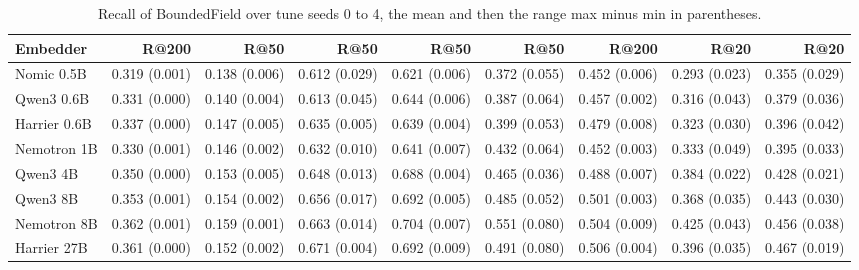 \begin{table}[!htbp]
\begin{subtable}{\textwidth}
\begin{tabular}{lrrrrrrrr}
Embedder & R@200 & R@50 & R@50 & R@50 & R@50 & R@200 & R@20 & R@20 \\
\midrule
Nomic 0.5B & 0.319 (0.001) & 0.138 (0.006) & 0.612 (0.029) & 0.621 (0.006) & 0.372 (0.055) & 0.452 (0.006) & 0.293 (0.023) & 0.355 (0.029) \\
Qwen3 0.6B & 0.331 (0.000) & 0.140 (0.004) & 0.613 (0.045) & 0.644 (0.006) & 0.387 (0.064) & 0.457 (0.002) & 0.316 (0.043) & 0.379 (0.036) \\
Harrier 0.6B & 0.337 (0.000) & 0.147 (0.005) & 0.635 (0.005) & 0.639 (0.004) & 0.399 (0.053) & 0.479 (0.008) & 0.323 (0.030) & 0.396 (0.042) \\
Nemotron 1B & 0.330 (0.001) & 0.146 (0.002) & 0.632 (0.010) & 0.641 (0.007) & 0.432 (0.064) & 0.452 (0.003) & 0.333 (0.049) & 0.395 (0.033) \\
Qwen3 4B & 0.350 (0.000) & 0.153 (0.005) & 0.648 (0.013) & 0.688 (0.004) & 0.465 (0.036) & 0.488 (0.007) & 0.384 (0.022) & 0.428 (0.021) \\
Qwen3 8B & 0.353 (0.001) & 0.154 (0.002) & 0.656 (0.017) & 0.692 (0.005) & 0.485 (0.052) & 0.501 (0.003) & 0.368 (0.035) & 0.443 (0.030) \\
Nemotron 8B & 0.362 (0.001) & 0.159 (0.001) & 0.663 (0.014) & 0.704 (0.007) & 0.551 (0.080) & 0.504 (0.009) & 0.425 (0.043) & 0.456 (0.038) \\
Harrier 27B & 0.361 (0.000) & 0.152 (0.002) & 0.671 (0.004) & 0.692 (0.009) & 0.491 (0.080) & 0.506 (0.004) & 0.396 (0.035) & 0.467 (0.019) \\
\bottomrule
\end{tabular}
\end{subtable}
\caption{Recall of BoundedField over tune seeds 0 to 4, the mean and then the range max minus min in parentheses.}
\label{tab:seeds}
\end{table}
